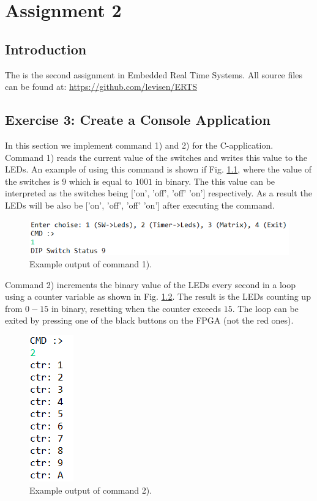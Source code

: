 \documentclass[a4paper,12pt]{report}    %
\begin{document}
\lstset{style=output}

\tableofcontents
\pagestyle{ProjectReport}
\newpage
\lstlistoflistings
\newpage

\chapter{Assignment 2}
\section{Introduction}
\lstset{style=code}


The is the second assignment in Embedded Real Time Systems.
All source files can be found at: \url{https://github.com/levisen/ERTS}

\section{Exercise 3: Create a Console Application}
In this section we implement command 1) and 2) for the C-application. Command 1) reads the current value of the switches and writes this value to the LEDs. An example of using this command is shown if Fig. \ref{cmd1}, where the value of the switches is $9$ which is equal to $1001$ in binary. The this value can be interpreted as the switches being {['on', 'off', 'off' 'on']} respectively. As a result the LEDs will be also be {['on', 'off', 'off' 'on']} after executing the command. \\

\begin{figure}[h]
  \centering
  \includegraphics[scale = 1]{latex/figures/test1.PNG}
  \caption{Example output of command 1).}
  \label{cmd1}
\end{figure}

Command 2) increments the binary value of the LEDs every second in a loop using a counter variable as shown in Fig. \ref{cmd2}. The result is the LEDs counting up from $0-15$ in binary, resetting when the counter exceeds $15$. The loop can be exited by pressing one of the black buttons on the FPGA (not the red ones).

\begin{figure}[h]
  \centering
  \includegraphics[scale = 1]{latex/figures/test2.PNG}
  \caption{Example output of command 2).}
  \label{cmd2}
\end{figure}
\end{document}

